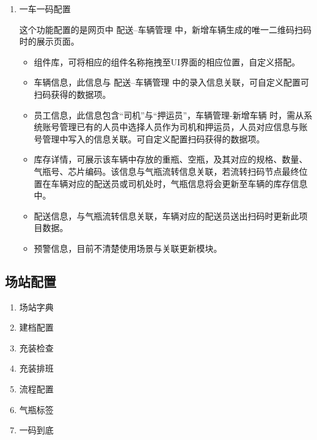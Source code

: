 \documentclass[UTF8]{ctexart}
\begin{document}
\begin{enumerate}
	
	\item 一车一码配置
	
	这个功能配置的是网页中 配送--车辆管理 中，新增车辆生成的唯一二维码扫码时的展示页面。
	\begin{itemize}
		\item 组件库，可将相应的组件名称拖拽至UI界面的相应位置，自定义搭配。
		\item 车辆信息，此信息与 配送--车辆管理 中的录入信息关联，可自定义配置可扫码获得的数据项。
		\item 员工信息，此信息包含“司机”与“押运员”，车辆管理-新增车辆 时，需从系统账号管理已有的人员中选择人员作为司机和押运员，人员对应信息与账号管理中写入的信息关联。可自定义配置扫码获得的数据项。
		\item 库存详情，可展示该车辆中存放的重瓶、空瓶，及其对应的规格、数量、气瓶号、芯片编码。该信息与气瓶流转信息关联，若流转扫码节点最终位置在车辆对应的配送员或司机处时，气瓶信息将会更新至车辆的库存信息中。
		\item 配送信息，与气瓶流转信息关联，车辆对应的配送员送出扫码时更新此项目数据。
		\item 预警信息，目前不清楚使用场景与关联更新模块。
	\end{itemize}
	
	
\end{enumerate}


\subsection{场站配置}

\begin{enumerate}
	\item 场站字典
	
	\item 建档配置
	
	\item 充装检查
	
	\item 充装排班
	
	\item 流程配置
	
	\item 气瓶标签
	
	\item 一码到底
	
	
	
\end{enumerate}
\end{document}
